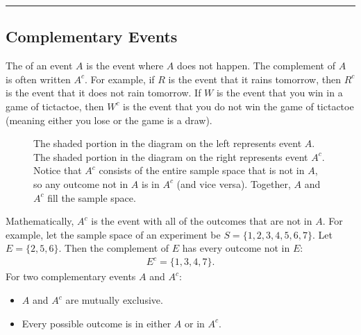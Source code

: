 \documentclass[letterpaper,10pt,english]{jupyterBook}
\begin{document}
\bigskip\hrule\bigskip



\subsection{Complementary Events}
\label{\detokenize{Ch3 Probability/3.4 Addition Rules and Mutually Exclusive Events:complementary-events}}
\sphinxAtStartPar
The  of an event \(A\) is the event where \(A\) does not happen. The complement of \(A\) is often written \(A^c\). For example, if \(R\) is the event that it rains tomorrow, then \(R^c\) is the event that it does not rain tomorrow. If \(W\) is the event that you win in a game of tic\sphinxhyphen{}tac\sphinxhyphen{}toe, then \(W^c\) is the event that you do not win the game of tic\sphinxhyphen{}tac\sphinxhyphen{}toe (meaning either you lose or the game is a draw).

\begin{figure}[htbp]
\centering
\capstart

\noindent{}
\caption{The shaded portion in the diagram on the left represents event \(A\). The shaded portion in the diagram on the right represents event \(A^c\). Notice that \(A^c\) consists of the entire sample space that is not in \(A\), so any outcome not in \(A\) is in \(A^c\) (and vice versa). Together, \(A\) and \(A^c\) fill the sample space.}\label{\detokenize{Ch3 Probability/3.4 Addition Rules and Mutually Exclusive Events:venncomp}}\end{figure}

\sphinxAtStartPar
Mathematically, \(A^c\) is the event with all of the outcomes that are not in \(A\). For example, let the sample space of an experiment be \(S = \{1, 2, 3, 4, 5, 6, 7\}\). Let \(E = \{2, 5, 6\}\). Then the complement of \(E\) has every outcome not in \(E\):
\begin{equation*}
\begin{split} E^c = \{1, 3, 4, 7\}. \end{split}
\end{equation*}
\sphinxAtStartPar
For two complementary events \(A\) and \(A^c\):
\begin{itemize}
\item {} 
\sphinxAtStartPar
\(A\) and \(A^c\) are mutually exclusive.

\item {} 
\sphinxAtStartPar
Every possible outcome is in either \(A\) or in \(A^c\).

\end{itemize}
\end{document}
